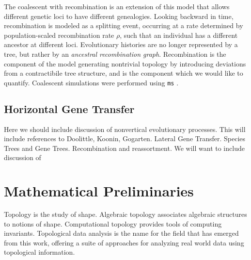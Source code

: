 The coalescent with recombination is an extension of this model that allows different genetic loci to have different genealogies.
Looking backward in time, recombination is modeled as a splitting event, occurring at a rate determined by population-scaled recombination rate $\rho$, such that an individual has a different ancestor at different loci.
Evolutionary histories are no longer represented by a tree, but rather by an \emph{ancestral recombination graph}.
Recombination is the component of the model generating nontrivial topology by introducing deviations from a contractibile tree structure, and is the component which we would like to quantify.
Coalescent simulations were performed using \texttt{ms} \cite{Hudson:2002}.


\subsection{Horizontal Gene Transfer}

Here we should include discussion of nonvertical evolutionary processes.
This will include references to Doolittle, Koonin, Gogarten.
Lateral Gene Transfer.
Species Trees and Gene Trees.
Recombination and reassortment.
We will want to include discussion of 


\section{Mathematical Preliminaries}


Topology is the study of shape.
Algebraic topology associates algebraic structures to notions of shape.
Computational topology provides tools of computing invariants.
Topological data analysis is the name for the field that has emerged from this work, offering a suite of approaches for analyzing real world data using topological information.

